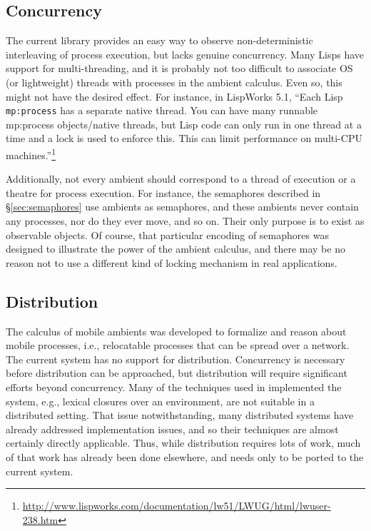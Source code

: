 \documentclass[12pt]{article}
\begin{document}
\subsection{Concurrency}
\label{sec:concurrency}

The current library provides an easy way to observe non-deterministic interleaving of process execution, but lacks genuine concurrency.
Many Lisps have support for multi-threading, and it is probably not too difficult to associate OS (or lightweight) threads with processes in the ambient calculus.
Even so, this might not have the desired effect.
For instance, in LispWorks 5.1, ``Each Lisp \texttt{mp:process} has a separate native thread.
You can have many runnable mp:process objects/native threads, but Lisp code can only run in one thread at a time and a lock is used to enforce this.
This can limit performance on multi-CPU machines.''\footnote{%
\url{http://www.lispworks.com/documentation/lw51/LWUG/html/lwuser-238.htm}}

Additionally, not every ambient should correspond to a thread of execution or a theatre for process execution.
For instance, the semaphores described in \S\ref{sec:semaphores} use ambients as semaphores, and these ambients never contain any processes, nor do they ever move, and so on.
Their only purpose is to exist as observable objects.
Of course, that particular encoding of semaphores was designed to illustrate the power of the ambient calculus, and there may be no reason not to use a different kind of locking mechanism in real applications.

\subsection{Distribution}
\label{sec:distribution}

The calculus of mobile ambients was developed to formalize and reason about mobile processes, i.e., relocatable processes that can be spread over a network.
The current system has no support for distribution.
Concurrency is necessary before distribution can be approached, but distribution will require significant efforts beyond concurrency.
Many of the techniques used in implemented the system, e.g., lexical closures over an environment, are not suitable in a distributed setting.
That issue notwithstanding, many distributed systems have already addressed implementation issues, and so their techniques are almost certainly directly applicable.
Thus, while distribution requires lots of work, much of that work has already been done elsewhere, and needs only to be ported to the current system.
\end{document}
